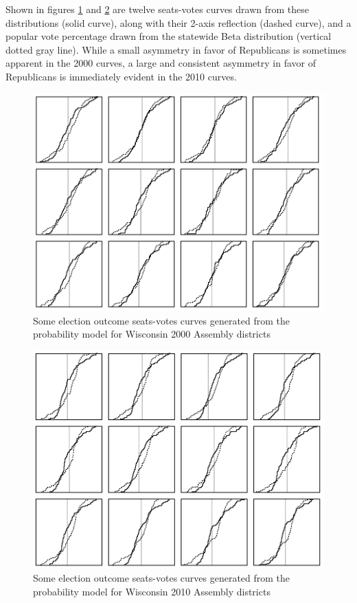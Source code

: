 \documentclass[preprint,12pt]{article}
\begin{document}
Shown in figures \ref{fig:SVAssembly2000} and \ref{fig:SVAssembly2010} are twelve seats-votes curves drawn from these distributions (solid curve), along with their 2-axis reflection (dashed curve), and a popular vote percentage drawn from the statewide Beta distribution (vertical dotted gray line). 
While a small asymmetry in favor of Republicans is sometimes apparent in the 2000 curves, a large and consistent asymmetry in favor of Republicans is immediately evident in the 2010 curves.

\begin{figure}[htb!]
    \begin{center}
        \includegraphics[scale=0.45]{../Figures/WI2000/4x4.png}
        \caption{Some election outcome seats-votes curves generated from the probability model for Wisconsin 2000 Assembly districts}\label{fig:SVAssembly2000}
    \end{center}
\end{figure}
\begin{figure}[htb!]
    \begin{center}
        \includegraphics[scale=0.45]{../Figures/WI2010/sv_curves_assembly.png}
        \caption{Some election outcome seats-votes curves generated from the probability model for Wisconsin 2010 Assembly districts}\label{fig:SVAssembly2010}
    \end{center}
\end{figure}
\end{document}

